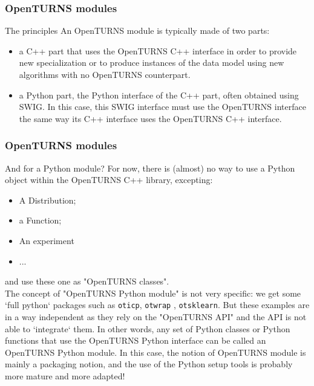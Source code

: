 \documentclass[8pt]{beamer}
\begin{document}
\begin{frame}
  \frametitle{OpenTURNS modules}
  \centering {}
  \begin{block}{The principles}
    An OpenTURNS module is typically made of two parts:
    \begin{itemize}
    \item a C++ part that uses the OpenTURNS C++ interface in order to provide new specialization or to produce instances of the data model using new algorithms with no OpenTURNS counterpart.
    \item a Python part, the Python interface of the C++ part, often obtained using SWIG. In this case, this SWIG interface must use the OpenTURNS interface the same way its C++ interface uses the OpenTURNS C++ interface.
    \end{itemize}
  \end{block}
\end{frame}
\begin{frame}
  \frametitle{OpenTURNS modules}
  \begin{block}{And for a Python module?}
    For now, there is (almost) no way to use a Python object within the OpenTURNS C++ library, excepting:
    \begin{itemize}
    \item A Distribution;
    \item a Function;
    \item An experiment
    \item ...
    \end{itemize}
    and use these one as "OpenTURNS classes".\\
    The concept of "OpenTURNS Python module" is not very specific: we get some `full python` packages such as \texttt{oticp}, \texttt{otwrap} , \texttt{otsklearn}. But these examples are in a way independent as they rely on the "OpenTURNS API" and the API is not able to `integrate` them.
    In other words, any set of Python classes or Python functions that use the OpenTURNS Python interface can be called an OpenTURNS Python module. In this case, the notion of OpenTURNS module is mainly a packaging notion, and the use of the Python setup tools is probably more mature and more adapted!
  \end{block}
\end{frame}
\end{document}
